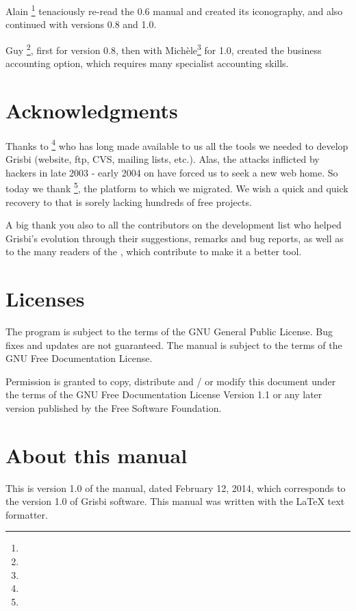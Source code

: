 {Alain }\footnote{\urlAlainLetientEmail{}} tenaciously re-read the 0.6 manual and created its iconography, and also continued with versions 0.8 and 1.0.

{Guy }\footnote{\urlGuyLebegueEmail{}}, first for version 0.8, then with {Michèle}\footnote{\urlMicheleBondilEmail{}} for 1.0, created the business accounting option, which requires many specialist accounting skills.

\section{Acknowledgments \label{introduction-thanks}}

Thanks to \footnote{\urlTuxFamily{}} who has long made available to us all the tools we needed to develop Grisbi 
(website, ftp, CVS, mailing lists, etc.). Alas, the attacks inflicted by hackers in late 2003 - early 2004 on  have forced us to seek a new web home. So today we thank \footnote{\urlSourceForge{}}, the platform to which we migrated.  We wish a quick and quick recovery to  that is sorely lacking hundreds of free projects.

A big thank you also to all the contributors on the development list who helped Grisbi's evolution through their suggestions, remarks and bug reports, as well as to the many readers of the , which contribute to make it a better tool.

\section{Licenses \label{introduction-licenses}}

The program is subject to the terms of the \gls{GNU General Public License}.  Bug fixes and updates are not guaranteed.  The manual is subject to the terms of the \gls{GNU Free Documentation License}.

Permission is granted to copy, distribute and / or modify this document under the terms of the GNU Free Documentation License Version 1.1 or any later version published by the Free Software Foundation.

\section{About this manual \label{introduction-manual}}

This is version \actuality{} 1.0 of the manual, dated \actuality{} February 12, 2014, which corresponds to the version 1.0 of Grisbi software.  This manual was written with the \gls{LaTeX}  \gls{text formatter}.

